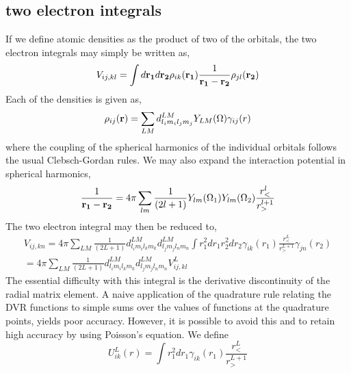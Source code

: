 \documentclass[preprint,showpacs,preprintnumbers,amsmath,amssymb]{revtex4}
\begin{document}
\subsection{two electron integrals}
If we define atomic densities as the product of two of the orbitals, the 
two electron integrals may simply be written as,
\begin{equation}
    V_{ij,kl} = \int d{\bf r_1} d{\bf r_2}  \rho_{ik}({\bf r_1}) 
                   \frac{1}{{\bf r_1} - {\bf r_2} } \rho_{jl}({\bf r_2 }) 
\end{equation}
Each of the densities is given as,
\begin{equation}
 \rho_{ij}({\bf r})  = \sum_{LM} d^{LM}_{l_{i}m_{i}l_{j}m_{j}} 
                                 Y_{LM}(\Omega) 
                       \gamma_{ij}(r) 
\end{equation}
where the coupling of the spherical harmonics of the individual orbitals
follows the usual Clebsch-Gordan rules.  We may also expand the interaction
potential in spherical harmonics,
\begin{equation}
    \frac{1}{{\bf r_1} - {\bf r_2} } = 4 \pi \sum_{lm} \frac{1}{(2l+1)} 
                                    Y_{lm}(\Omega_{1}) Y_{lm}(\Omega_{2}) 
                                      \frac{r_{<}^{l}}{r_{>}^{l+1}}
\end{equation}
The two electron integral may then be reduced to,
\begin{eqnarray}
    V_{ij,kn} = 4 \pi \sum_{LM} \frac{1}{(2L+1)} 
                d^{LM}_{l_{i}m_{i}l_{k}m_{k}} d^{LM}_{l_{j}m_{j}l_{n}m_{n}} 
                  \int r^{2}_{1} dr_1 r^{2}_{2} dr_2
                  \gamma_{ik}(r_1) \frac{r_{<}^{L}}{r_{>}^{L+1}}
                   \gamma_{jn}(r_2)      \\ \nonumber
              = 4 \pi \sum_{LM} \frac{1}{(2L+1)} 
                d^{LM}_{l_{i}m_{i}l_{k}m_{k}} d^{LM}_{l_{j}m_{j}l_{n}m_{n}} 
                V^{L}_{ij,kl}
\end{eqnarray}
The essential difficulty with this integral is the derivative discontinuity
of the radial matrix element.  A naive application of the quadrature rule
relating the DVR functions to simple sums over the values of functions at
the quadrature points, yields poor accuracy.  However, it is possible to 
avoid this and to retain high accuracy by using Poisson's equation.  
We define
\begin{equation}
    U^{L}_{ik}(r) = \int r_{1}^{2} dr_{1} 
                     \gamma_{ik}(r_1) \frac{r_{<}^{L}}{r_{>}^{L+1}}      
\end{equation}
\end{document}
